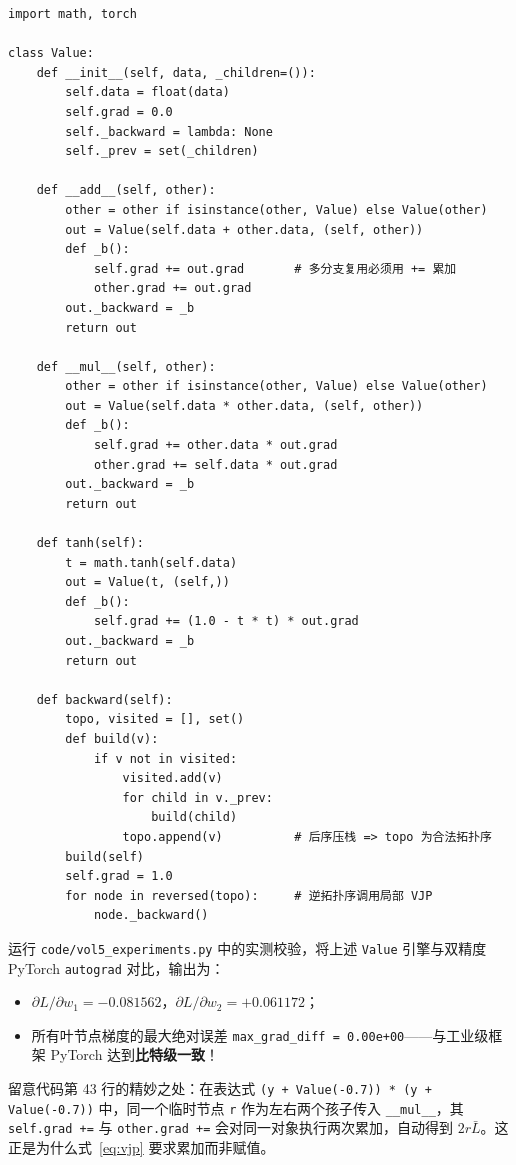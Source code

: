 \begin{lstlisting}[caption={极简反向模式自动微分引擎 \texttt{Value} 与 PyTorch 精度互验}]
import math, torch

class Value:
    def __init__(self, data, _children=()):
        self.data = float(data)
        self.grad = 0.0
        self._backward = lambda: None
        self._prev = set(_children)

    def __add__(self, other):
        other = other if isinstance(other, Value) else Value(other)
        out = Value(self.data + other.data, (self, other))
        def _b():
            self.grad += out.grad       # 多分支复用必须用 += 累加
            other.grad += out.grad
        out._backward = _b
        return out

    def __mul__(self, other):
        other = other if isinstance(other, Value) else Value(other)
        out = Value(self.data * other.data, (self, other))
        def _b():
            self.grad += other.data * out.grad
            other.grad += self.data * out.grad
        out._backward = _b
        return out

    def tanh(self):
        t = math.tanh(self.data)
        out = Value(t, (self,))
        def _b():
            self.grad += (1.0 - t * t) * out.grad
        out._backward = _b
        return out

    def backward(self):
        topo, visited = [], set()
        def build(v):
            if v not in visited:
                visited.add(v)
                for child in v._prev:
                    build(child)
                topo.append(v)          # 后序压栈 => topo 为合法拓扑序
        build(self)
        self.grad = 1.0
        for node in reversed(topo):     # 逆拓扑序调用局部 VJP
            node._backward()
\end{lstlisting}

运行 \texttt{code/vol5\_experiments.py} 中的实测校验，将上述 \texttt{Value} 引擎与双精度 PyTorch \texttt{autograd} 对比，输出为：
\begin{itemize}
  \item $\partial L / \partial w_1 = -0.081562$，$\partial L / \partial w_2 = +0.061172$；
  \item 所有叶节点梯度的最大绝对误差 \texttt{max\_grad\_diff = 0.00e+00}——与工业级框架 PyTorch 达到\textbf{比特级一致}！
\end{itemize}
留意代码第 43 行的精妙之处：在表达式 \texttt{(y + Value(-0.7)) * (y + Value(-0.7))} 中，同一个临时节点 \texttt{r} 作为左右两个孩子传入 \texttt{\_\_mul\_\_}，其 \texttt{self.grad +=} 与 \texttt{other.grad +=} 会对同一对象执行两次累加，自动得到 $2r\bar{L}$。这正是为什么式~\eqref{eq:vjp} 要求累加而非赋值。

